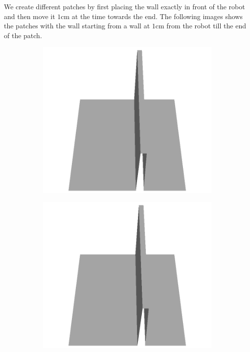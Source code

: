 \documentclass[../document.tex]{subfiles}
\begin{document}
We create different patches by first placing the wall exactly in front of the robot and then move it $1$cm at the time towards the end. The following images shows the patches with the wall starting from a wall at $1$cm from the robot till the end of the patch.
\begin{figure}[H]
    \centering
    \begin{subfigure}[b]{0.065\textwidth}
    \includegraphics[width=\linewidth]{../img/5/custom_patches/walls_front/all/55-3d.png}
    \end{subfigure}
    \begin{subfigure}[b]{0.065\textwidth}
    \includegraphics[width=\linewidth]{../img/5/custom_patches/walls_front/all/54-3d.png}

\end{subfigure}
\end{figure}
\end{document}
